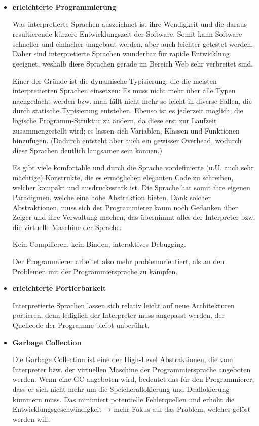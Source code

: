 \begin{itemize}

  \item \textbf{erleichterte Programmierung}

        Was interpretierte Sprachen auszeichnet ist ihre Wendigkeit und die
        daraus resultierende kürzere Entwicklungszeit der Software. Somit kann
        Software schneller und einfacher umgebaut werden, aber auch leichter
        getestet werden. Daher sind interpretierte Sprachen wunderbar für
        rapide Entwicklung geeignet, weshalb diese Sprachen gerade im Bereich
        Web sehr verbreitet sind.

        Einer der Gründe ist die dynamische Typisierung, die die meisten
        interpretierten Sprachen einsetzen: Es muss nicht mehr über alle Typen
        nachgedacht werden bzw. man fällt nicht mehr so leicht in diverse
        Fallen, die durch statische Typisierung entstehen. Ebenso ist es
        jederzeit möglich, die logische Programm-Struktur zu ändern, da diese
        erst zur Laufzeit zusammengestellt wird; es lassen sich Variablen,
        Klassen und Funktionen hinzufügen. (Dadurch entsteht aber auch ein
        gewisser Overhead, wodurch diese Sprachen deutlich langsamer sein
        können.)

        Es gibt viele komfortable und durch die Sprache vordefinierte (u.U.
        auch sehr mächtige) Konstrukte, die es ermöglichen eleganten Code zu
        schreiben, welcher kompakt und ausdrucksstark ist. Die Sprache hat
        somit ihre eigenen Paradigmen, welche eine hohe Abstraktion bieten.
        Dank solcher Abstraktionen, muss sich der Programmierer kaum  noch
        Gedanken über Zeiger und ihre Verwaltung machen, das übernimmt alles
        der Interpreter bzw. die virtuelle Maschine der Sprache.

        Kein Compilieren, kein Binden, interaktives Debugging.

        Der Programmierer arbeitet also mehr problemorientiert, als an den
        Problemen mit der Programmiersprache zu kämpfen.

  \item \textbf{erleichterte Portierbarkeit}

        Interpretierte Sprachen lassen sich relativ leicht auf neue
        Architekturen portieren, denn lediglich der Interpreter muss angepasst
        werden, der Quellcode der Programme bleibt unberührt.

  \item \textbf{Garbage Collection}

        Die Garbage Collection ist eine der High-Level Abstraktionen, die vom
        Interpreter bzw. der virtuellen Maschine der Programmiersprache
        angeboten werden. Wenn eine GC angeboten wird, bedeutet das für den
        Programmierer, dass er sich nicht mehr um die Speicherallokierung und
        Deallokierung kümmern muss. Das minimiert potentielle Fehlerquellen
        und erhöht die Entwicklungsgeschwindigkeit → mehr Fokus auf das
        Problem, welches gelöst werden will.

\end{itemize}


